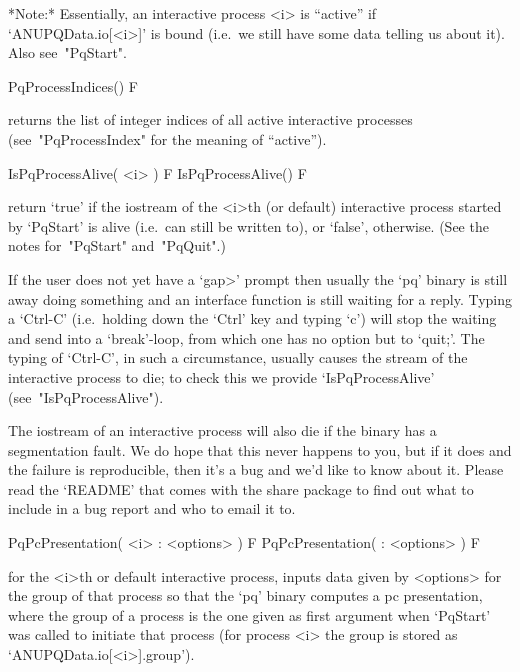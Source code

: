 *Note:*
Essentially,  an  interactive  {\ANUPQ}  process  <i>  is  ``active''  if
`ANUPQData.io[<i>]' is bound (i.e.~we still have  some  data  telling  us
about it). Also see~"PqStart".

\>PqProcessIndices() F

returns the list of integer indices of all  active  interactive  {\ANUPQ}
processes (see~"PqProcessIndex" for the meaning of ``active'').

\>IsPqProcessAlive( <i> ) F
\>IsPqProcessAlive() F

return  `true'  if  the  {\GAP}  iostream  of  the  <i>th  (or   default)
interactive {\ANUPQ} process started  by  `PqStart'  is  alive  (i.e.~can
still be written to), or `false', otherwise. (See the notes for~"PqStart"
and~"PqQuit".)

If the user does not yet have a  `gap>'  prompt  then  usually  the  `pq'
binary is still away doing something and an {\ANUPQ}  interface  function
is still waiting for a reply. Typing a `Ctrl-C'  (i.e.~holding  down  the
`Ctrl' key and typing `c') will stop the waiting and send {\GAP}  into  a
`break'-loop, from which one has no option but to `quit;'. The typing  of
`Ctrl-C', in such a  circumstance,  usually  causes  the  stream  of  the
interactive  {\ANUPQ}  process  to  die;  to  check   this   we   provide
`IsPqProcessAlive' (see~"IsPqProcessAlive").

The {\GAP} iostream of an interactive {\ANUPQ} process will also  die  if
the {\ANUPQ} binary has a segmentation fault. We do hope that this  never
happens to you, but if it does and the failure is reproducible, then it's
a bug and we'd like to know about it. Please read the `README' that comes
with the {\ANUPQ} share package to find out what  to  include  in  a  bug
report and who to email it to.


\>PqPcPresentation( <i> : <options> ) F
\>PqPcPresentation( : <options> ) F

for the <i>th or default interactive {\ANUPQ} process, inputs data  given
by <options> for the group of  that  process  so  that  the  `pq'  binary
computes a pc presentation, where the group of a process is the one given
as first argument when `PqStart' was called to initiate that process (for
process <i> the group is stored as `ANUPQData.io[<i>].group').

